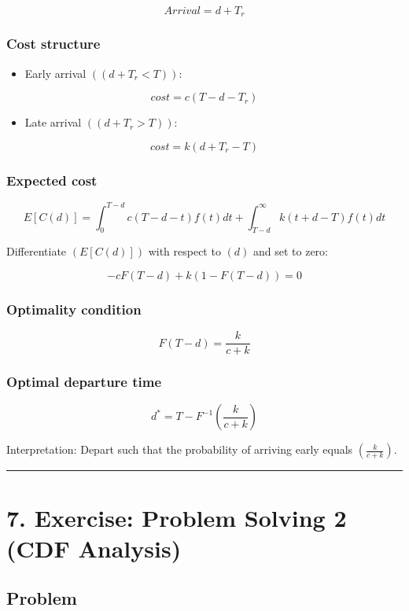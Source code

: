 \documentclass[12pt]{article}
\begin{document}
\[
Arrival=d+T_r
\]

\subsubsection*{\textbf{Cost structure}}

\begin{itemize}
    \item Early arrival $((d+T_r<T))$:
\end{itemize}

\[
cost=c(T-d-T_r)
\]

\begin{itemize}
    \item Late arrival $((d+T_r>T))$:
\end{itemize}

\[
cost=k(d+T_r-T)
\]

\subsubsection*{\textbf{Expected cost}}

\[
E[C(d)]=\int_0^{T-d}c(T-d-t)f(t)dt+\int_{T-d}^{\infty}k(t+d-T)f(t)dt
\]

Differentiate $(E[C(d)])$ with respect to $(d)$ and set to zero:

\[
-cF(T-d)+k(1-F(T-d))=0
\]

\subsubsection*{\textbf{Optimality condition}}

\[
F(T-d)=\frac{k}{c+k}
\]

\subsubsection*{\textbf{Optimal departure time}}

\[
d^*=T-F^{-1}\left(\frac{k}{c+k}\right)
\]

Interpretation: Depart such that the probability of arriving early equals $\left(\frac{k}{c+k}\right)$.

\hrule
\vspace{1em}

\section*{\textbf{7. Exercise: Problem Solving 2 (CDF Analysis)}}

\subsection*{\textbf{Problem}}
\end{document}
